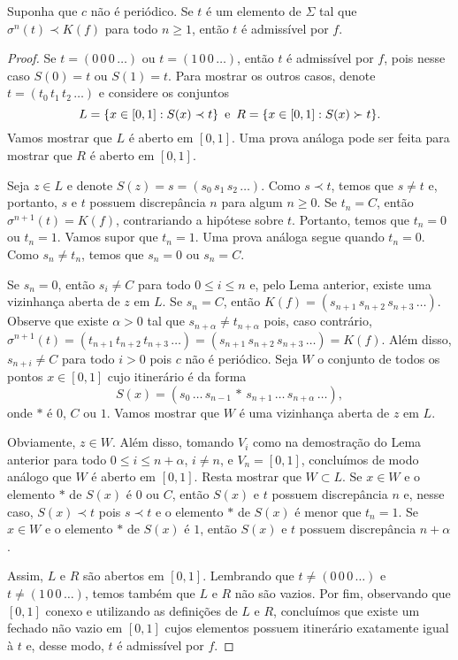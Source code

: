 \begin{theorem}
Suponha que $c$ não é periódico. Se $t$ é um elemento de $\Sigma$ tal que $\sigma^n(t) \prec K(f)$ para todo $n \geq 1$, então $t$ é admissível por $f$.
\end{theorem}

\begin{proof}
Se $t = (0\, 0\, 0\, \dots)$ ou $t = (1\, 0\, 0\, \dots)$, então $t$ é admissível por $f$, pois nesse caso $S(0) = t$ ou $S(1) = t$. Para mostrar os outros casos, denote $t = (t_0\, t_1\, t_2\, \dots)$ e considere os conjuntos 
$$L = \{ x \in [0, 1] : S(x) \prec t \} \text{\, e \,} R = \{ x \in [0, 1] : S(x) \succ t \}.$$
Vamos mostrar que $L$ é aberto em $[0, 1]$. Uma prova análoga pode ser feita para mostrar que $R$ é aberto em $[0, 1]$.

Seja $z \in L$ e denote $S(z) = s = (s_0 \, s_1 \, s_2 \, \dots)$. Como $s \prec t$, temos que $s \neq t$ e, portanto, $s$ e $t$ possuem discrepância $n$ para algum $n \geq 0$. Se $t_n = C$, então $\sigma^{n+1}(t) = K(f)$, contrariando a hipótese sobre $t$. Portanto, temos que $t_n = 0$ ou $t_n = 1$. Vamos supor que $t_n = 1$. Uma prova análoga segue quando $t_n = 0$. Como $s_n \neq t_n$, temos que $s_n = 0$ ou $s_n = C$. 

Se $s_n = 0$, então $s_i \neq C$ para todo $0 \leq i \leq n$ e, pelo Lema anterior, existe uma vizinhança aberta de $z$ em $L$. Se $s_n = C$, então $K(f) = (s_{n+1}\, s_{n+2}\, s_{n+3}\, \dots)$. Observe que existe $\alpha > 0$ tal que $s_{n+\alpha} \neq t_{n+\alpha}$ pois, caso contrário, $\sigma^{n+1}(t) = (t_{n+1}\, t_{n+2}\, t_{n+3}\, \dots) = (s_{n+1}\, s_{n+2}\, s_{n+3}\, \dots) = K(f)$. Além disso, $s_{n+i} \neq C$ para todo $i > 0$ pois $c$ não é periódico. Seja $W$ o conjunto de todos os pontos $x \in [0, 1]$ cujo itinerário é da forma
$$S(x) = (s_0\, \dots\, s_{n-1}\, *\, s_{n+1}\, \dots\, s_{n+\alpha}\, \dots),$$
onde $*$ é $0$, $C$ ou $1$. Vamos mostrar que $W$ é uma vizinhança aberta de $z$ em $L$.

Obviamente, $z \in W$. Além disso, tomando $V_i$ como na demostração do Lema anterior para todo $0 \leq i \leq n+\alpha$, $i \neq n$, e $V_n = [0, 1]$, concluímos de modo análogo que $W$ é aberto em $[0, 1]$. Resta mostrar que $W \subset L$. Se $x \in W$ e o elemento $*$ de $S(x)$ é $0$ ou $C$, então $S(x)$ e $t$ possuem discrepância $n$ e, nesse caso, $S(x) \prec t$ pois $s \prec t$ e o elemento $*$ de $S(x)$ é menor que $t_n = 1$. Se $x \in W$ e o elemento $*$ de $S(x)$ é $1$, então $S(x)$ e $t$ possuem discrepância $n+\alpha$.

Assim, $L$ e $R$ são abertos em $[0, 1]$. Lembrando que $t \neq (0\, 0\, 0\, \dots)$ e $t \neq (1\, 0\, 0\, \dots)$, temos também que $L$ e $R$ não são vazios. Por fim, observando que $[0, 1]$ conexo e utilizando as definições de $L$ e $R$, concluímos que existe um fechado não vazio em $[0, 1]$ cujos elementos possuem itinerário exatamente igual à $t$ e, desse modo, $t$ é admissível por $f$.
\end{proof}












